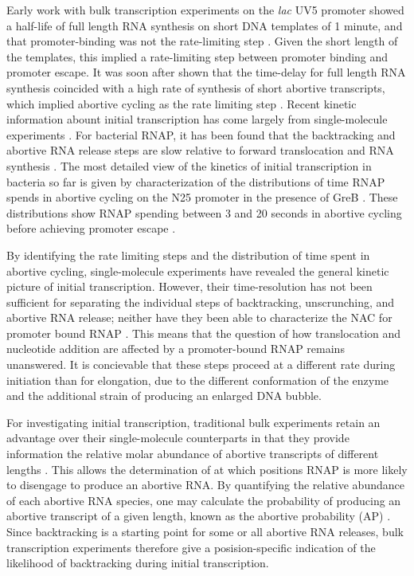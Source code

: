 Early work with bulk transcription experiments on the \textit{lac} UV5
promoter showed a half-life of full length RNA synthesis on short DNA
templates of 1 minute, and that promoter-binding was not the rate-limiting
step \cite{stefano_lac_1979}. Given the short length of the templates, this
implied a rate-limiting step between promoter binding and promoter escape. It
was soon after shown that the time-delay for full length RNA synthesis
coincided with a high rate of synthesis of short abortive transcripts, which
implied abortive cycling as the rate limiting step
\cite{munson_abortive_1981}. Recent kinetic information abount initial
transcription has come largely from single-molecule experiments
\cite{revyakin_abortive_2006, kapanidis_initial_2006, tang_real-time_2009,
kapanidis_retention_2005, margeat_direct_2006}. For bacterial RNAP, it has
been found that the backtracking and abortive RNA release steps are slow
relative to forward translocation and RNA synthesis
\cite{revyakin_abortive_2006, margeat_direct_2006}. The most detailed view of
the kinetics of initial transcription in bacteria so far is given by
characterization of the distributions of time RNAP spends in abortive cycling
on the N25 promoter in the presence of GreB \cite{revyakin_abortive_2006}.
These distributions show RNAP spending between 3 and 20 seconds in abortive
cycling before achieving promoter escape \cite{revyakin_abortive_2006}.

By identifying the rate limiting steps and the distribution of time spent in
abortive cycling, single-molecule experiments have revealed the general
kinetic picture of initial transcription. However, their time-resolution has
not been sufficient for separating the individual steps of backtracking,
unscrunching, and abortive RNA release; neither have they been able to
characterize the NAC for promoter bound RNAP \cite{revyakin_abortive_2006,
margeat_direct_2006}. This means that the question of how translocation and
nucleotide addition are affected by a promoter-bound RNAP remains unanswered.
It is concievable that these steps proceed at a different rate during
initiation than for elongation, due to the different conformation of the
enzyme and the additional strain of producing an enlarged DNA bubble.

For investigating initial transcription, traditional bulk experiments retain
an advantage over their single-molecule counterparts in that they provide
information the relative molar abundance of abortive transcripts of different
lengths \cite{hsu_monitoring_2009}. This allows the determination of at which
positions RNAP is more likely to disengage to produce an abortive RNA. By
quantifying the relative abundance of each abortive RNA species, one may
calculate the probability of producing an abortive transcript of a given
length, known as the abortive probability (AP) \cite{hsu_promoter_2002,
hsu_quantitative_1996}. Since backtracking is a starting point for some or
all abortive RNA releases, bulk transcription experiments therefore give a
posision-specific indication of the likelihood of backtracking during initial
transcription.

